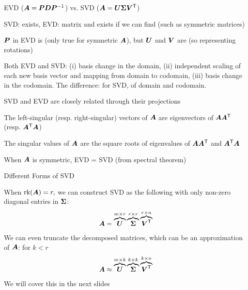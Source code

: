 \documentclass[fleqn,aspectratio=169]{beamer}
\begin{document}
\begin{frame}{EVD ($\bm{A} = \bm{P} \bm{D} {{\bm{P}}^{-1}}$) vs. SVD ($\bm{A} = \bm{U} \bm{\Sigma} {\bm{V}}^{\mathsf{T}}$)}

\plitemsep 0.07in

\bci 
\item SVD:  exists, EVD:  matrix and exists if we can find  (such as symmetric matrices)

\item $\bm{P}$ in EVD is  (only true for symmetric $\bm{A}$), but $\bm{U}$ and $\bm{V}$ are  (so representing rotations)

\item Both EVD and SVD: (i) basis change in the domain, (ii) independent scaling of each new basis vector and mapping from domain to codomain, (iii) basis change in the codomain. The difference: for SVD,  of domain and codomain. 

\item SVD and EVD are closely related through their projections
\bci
\item The left-singular (resp. right-singular) vectors of $\bm{A}$ are eigenvectors of $\bm{A} {\bm{A}}^{\mathsf{T}}$ (resp. ${\bm{A}}^{\mathsf{T}} \bm{A}$)
\item The singular values of $\bm{A}$ are the square roots of eigenvalues of $\bm{A} {\bm{A}}^{\mathsf{T}}$ and ${\bm{A}}^{\mathsf{T}} \bm{A}$
\item When $\bm{A}$ is symmetric, EVD = SVD (from spectral theorem)
\eci
\eci
\end{frame}

\begin{frame}{Different Forms of SVD}

\plitemsep 0.1in

\bci 

\item When $\text{rk}(\bm{A}) = r,$ we can construct SVD as the following with only non-zero diagonal entries in $\bm{\Sigma}$:
$$
\bm{A} = \overbrace{\bm{U}}^{m \times r} \overbrace{\bm{\Sigma} }^{r \times r} \overbrace{{\bm{V}}^{\mathsf{T}}}^{r \times n}
$$

\item We can even truncate the decomposed matrices, which can be an approximation of $\bm{A}$: for $k < r$
$$
\bm{A} \approx \overbrace{\bm{U}}^{m \times k} \overbrace{\bm{\Sigma} }^{k \times k} \overbrace{{\bm{V}}^{\mathsf{T}}}^{k \times n}
$$

\medskip
We will cover this in the next slides
\eci
\end{frame}
\end{document}
